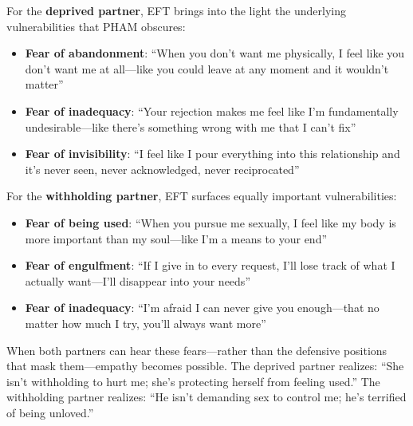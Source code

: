\documentclass[12pt, letterpaper]{article}
\begin{document}
For the \textbf{deprived partner}, EFT brings into the light the underlying vulnerabilities that PHAM obscures:
\begin{itemize}
    \item \textbf{Fear of abandonment}: ``When you don't want me physically, I feel like you don't want me at all---like you could leave at any moment and it wouldn't matter''
    \item \textbf{Fear of inadequacy}: ``Your rejection makes me feel like I'm fundamentally undesirable---like there's something wrong with me that I can't fix''
    \item \textbf{Fear of invisibility}: ``I feel like I pour everything into this relationship and it's never seen, never acknowledged, never reciprocated''
\end{itemize}

For the \textbf{withholding partner}, EFT surfaces equally important vulnerabilities:
\begin{itemize}
    \item \textbf{Fear of being used}: ``When you pursue me sexually, I feel like my body is more important than my soul---like I'm a means to your end''
    \item \textbf{Fear of engulfment}: ``If I give in to every request, I'll lose track of what I actually want---I'll disappear into your needs''
    \item \textbf{Fear of inadequacy}: ``I'm afraid I can never give you enough---that no matter how much I try, you'll always want more''
\end{itemize}

When both partners can hear these fears---rather than the defensive positions that mask them---empathy becomes possible. The deprived partner realizes: ``She isn't withholding to hurt me; she's protecting herself from feeling used.'' The withholding partner realizes: ``He isn't demanding sex to control me; he's terrified of being unloved.''
\end{document}
